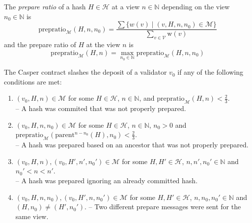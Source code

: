 \documentclass[11pt,letterpaper]{article}
\newcommand{\uint}{\mathbb{N}}
\newcommand{\validators}{\mathcal{V}}
\newcommand{\messages}{\mathcal{M}}
\begin{document}
The \emph{prepare ratio} of a hash $H \in \mathcal{H}$ at a view $n \in \uint$ depending
on the view $n_0 \in \uint$ is
\[
\mathrm{prepratio}_{\messages}(H, n, n_0) =
\frac{\sum\{w(v) \mid (v, H, n, n_0) \in \messages \}}{\sum_{v \in \validators}\mathrm{w}(v)}
\]
and the prepare ratio of $H$ at the view $n$ is
\[
\mathrm{prepratio}_{\messages}(H, n) = \max_{n_0 \in \uint} \mathrm{prepratio}_\messages(H, n, n_0)
\]

The Casper contract slashes the deposit of a validator $v_0$ if any of the following conditions
are met:

\begin{enumerate}
\item $(v_0, H, n) \in \messages$ for some $H \in \mathcal{H}$, $n \in \uint$,
and $\mathrm{prepratio}_\messages(H, n) < \frac{2}{3}$.\\
-- A hash was commited that was not properly prepared.
\item $(v_0, H, n, n_0) \in \messages$ for some $H \in \mathcal{H}$, $n \in \uint$,
$n_0 > 0$ and $\mathrm{prepratio}_\messages(\mathrm{parent}^{n-n_0}(H), n_0) < \frac{2}{3}$.\\
-- A hash was prepared based on an ancestor that was not properly prepared.
\item $(v_0, H, n), (v_0, H', n', n_0') \in \messages$ for some $H,H' \in \mathcal{H}$, $n, n', n_0' \in \uint$
and $n_0' < n < n'$.\\
-- A hash was prepared ignoring an already committed hash.
\item $(v_0, H, n, n_0), (v_0, H', n, n_0') \in \messages$ for some $H, H' \in \mathcal{H}$,
$n, n_0, n_0' \in \uint$ and $(H, n_0) \neq (H', n_0')$.
-- Two different prepare messages were sent for the same view.
\end{enumerate}
\end{document}
